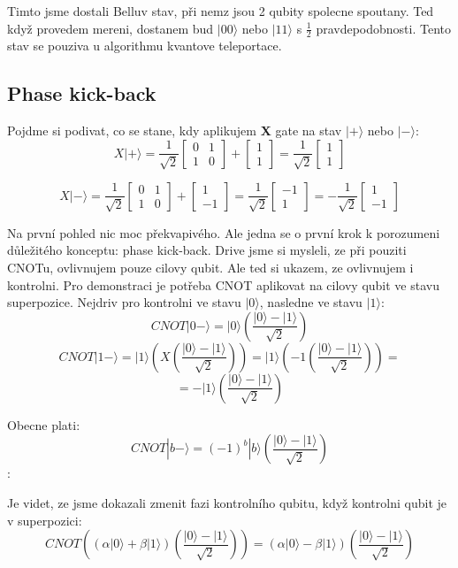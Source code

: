 \documentclass[11pt]{article}
\begin{document}
\par Timto jsme dostali Belluv stav, při nemz jsou 2 qubity spolecne spoutany.
Ted když provedem mereni, dostanem bud $|00\rangle$ nebo $|11\rangle$ s $\frac{1}{2}$ pravdepodobnosti.
Tento stav se pouziva u algorithmu kvantove teleportace.

\subsection{Phase kick-back}
Pojdme si podivat, co se stane, kdy aplikujem \textbf{X} gate na stav $|+\rangle$ nebo $|-\rangle$:
$$X|+\rangle = \frac{1}{\sqrt{2}}\begin{bmatrix}
        0 & 1 \\
        1 & 0
    \end{bmatrix} + \begin{bmatrix}
        1 \\
        1
    \end{bmatrix} = \frac{1}{\sqrt{2}} \begin{bmatrix}
        1 \\
        1
    \end{bmatrix} $$

$$X|-\rangle = \frac{1}{\sqrt{2}}\begin{bmatrix}
        0 & 1 \\
        1 & 0
    \end{bmatrix} + \begin{bmatrix}
        1 \\
        -1
    \end{bmatrix} = \frac{1}{\sqrt{2}} \begin{bmatrix}
        -1 \\
        1
    \end{bmatrix} = -\frac{1}{\sqrt{2}} \begin{bmatrix}
        1 \\
        -1
    \end{bmatrix} $$
\par Na první pohled nic moc překvapivého.
Ale jedna se o první krok k porozumeni důležitého konceptu: phase kick-back.
Drive jsme si mysleli, ze při pouziti CNOTu, ovlivnujem pouze cilovy qubit.
Ale ted si ukazem, ze ovlivnujem i kontrolni.
Pro demonstraci je potřeba CNOT aplikovat na cilovy qubit ve stavu superpozice.
Nejdriv pro kontrolni ve stavu $|0\rangle$, nasledne ve stavu $|1\rangle$:
$$CNOT |0-\rangle = |0\rangle \left(\frac{|0\rangle - |1\rangle}{\sqrt{2}}\right)$$
$$CNOT |1-\rangle = |1\rangle \left(X \left(\frac{|0\rangle - |1\rangle}{\sqrt{2}}\right)\right) = |1\rangle \left(-1\left(\frac{|0\rangle - |1\rangle}{\sqrt{2}}\right)\right) =$$
$$= -|1\rangle \left(\frac{|0\rangle - |1\rangle}{\sqrt{2}}\right)$$
\par Obecne plati:
$$CNOT |b-\rangle = (-1)^b|b\rangle\left(\frac{|0\rangle - |1\rangle}{\sqrt{2}}\right)$$:
\par Je videt, ze jsme dokazali zmenit fazi kontrolního qubitu, když kontrolni qubit je v superpozici:
$$CNOT\left((\alpha|0\rangle + \beta|1\rangle)\left(\frac{|0\rangle - |1\rangle}{\sqrt{2}}\right)\right) = (\alpha|0\rangle - \beta|1\rangle)\left(\frac{|0\rangle - |1\rangle}{\sqrt{2}}\right)$$
\newpage
\end{document}
